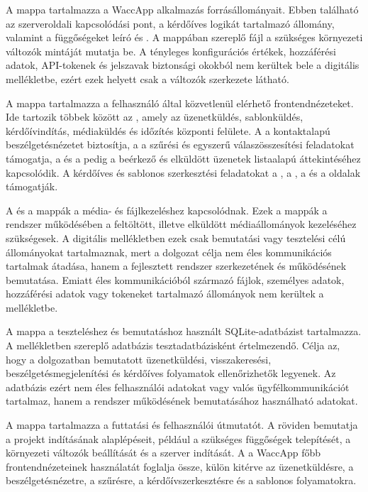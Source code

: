 A  mappa tartalmazza a WaccApp alkalmazás forrásállományait. Ebben található az  szerveroldali kapcsolódási pont, a  kérdőíves logikát tartalmazó állomány, valamint a függőségeket leíró  és . A mappában szereplő  fájl a szükséges környezeti változók mintáját mutatja be. A tényleges konfigurációs értékek, hozzáférési adatok, API-tokenek és jelszavak biztonsági okokból nem kerültek bele a digitális mellékletbe, ezért ezek helyett csak a változók szerkezete látható.

A  mappa tartalmazza a felhasználó által közvetlenül elérhető frontendnézeteket. Ide tartozik többek között az , amely az üzenetküldés, sablonküldés, kérdőívindítás, médiaküldés és időzítés központi felülete. A  a kontaktalapú beszélgetésnézetet biztosítja, a  a szűrési és egyszerű válaszösszesítési feladatokat támogatja, a  és a  pedig a beérkező és elküldött üzenetek listaalapú áttekintéséhez kapcsolódik. A kérdőíves és sablonos szerkesztési feladatokat a , a , a  és a  oldalak támogatják.

A  és a  mappák a média- és fájlkezeléshez kapcsolódnak. Ezek a mappák a rendszer működésében a feltöltött, illetve elküldött médiaállományok kezeléséhez szükségesek. A digitális mellékletben ezek csak bemutatási vagy tesztelési célú állományokat tartalmaznak, mert a dolgozat célja nem éles kommunikációs tartalmak átadása, hanem a fejlesztett rendszer szerkezetének és működésének bemutatása. Emiatt éles kommunikációból származó fájlok, személyes adatok, hozzáférési adatok vagy tokeneket tartalmazó állományok nem kerültek a mellékletbe.

A  mappa a teszteléshez és bemutatáshoz használt SQLite-adatbázist tartalmazza. A mellékletben szereplő adatbázis tesztadatbázisként értelmezendő. Célja az, hogy a dolgozatban bemutatott üzenetküldési, visszakeresési, beszélgetésmegjelenítési és kérdőíves folyamatok ellenőrizhetők legyenek. Az adatbázis ezért nem éles felhasználói adatokat vagy valós ügyfélkommunikációt tartalmaz, hanem a rendszer működésének bemutatásához használható adatokat.

A  mappa tartalmazza a futtatási és felhasználói útmutatót. A  röviden bemutatja a projekt indításának alaplépéseit, például a szükséges függőségek telepítését, a környezeti változók beállítását és a szerver indítását. A  a WaccApp főbb frontendnézeteinek használatát foglalja össze, külön kitérve az üzenetküldésre, a beszélgetésnézetre, a szűrésre, a kérdőívszerkesztésre és a sablonos folyamatokra.

